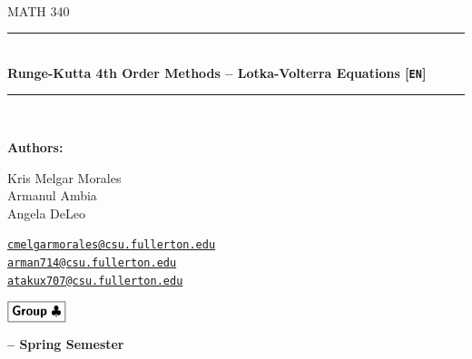 \documentclass[12pt]{article}
\newcommand{\HRule}{\rule{\linewidth}{0.5mm}} %
\begin{document}
\begin{center}
    \mbox{}\\[2.0cm]
    \textsc{\Huge MATH 340}\\[2.5cm]
    \HRule\\[0.4cm]
    {\large \bf {\selectfont Runge-Kutta 4th Order Methods -- Lotka-Volterra Equations} [\texttt{EN}]}\\[0.2cm]
    \HRule\\[1.5cm]
\end{center}

\begin{flushleft}
    \textbf{\selectfont Authors:}
\end{flushleft}

\begin{center}
    \begin{minipage}{0.5\textwidth}
        \begin{flushleft}
            Kris Melgar Morales \\
            Armanul Ambia \\
            Angela DeLeo 
        \end{flushleft}
    \end{minipage}%
    \begin{minipage}{0.5\textwidth}
        \begin{flushright}
            \href{mailto:cmelgarmorales@csu.fullerton.edu}{\texttt{cmelgarmorales@csu.fullerton.edu}}\\
            \href{mailto:arman714@csu.fullerton.edu}{\texttt{arman714@csu.fullerton.edu}}\\
            \href{mailto:atakux707@csu.fullerton.edu}{\texttt{atakux707@csu.fullerton.edu}}
        \end{flushright}
    \end{minipage}
\end{center}
    
\begin{flushleft}
    \large $\boxed{\text{\bf \fontfamily{cmss}\selectfont Group} \ \clubsuit}$\\[4.0cm]
\end{flushleft}
    
\begin{center}
    \large \bf {} -- Spring Semester
\end{center}
\end{document}
